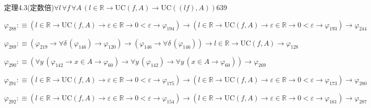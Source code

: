 \begin{fullproof}{定理4.3(定数倍)}{$\forall l\,\forall f\,\forall A\,(l \in \mathbb{R} \to \mathrm{UC}(f,A) \to \mathrm{UC}((l f),A))$}{639}
\begin{abbrevlist}
\item $\varphi_{288} :\equiv (l \in \mathbb{R} \to \mathrm{UC}(f,A) \to \varepsilon \in \mathbb{R} \to 0 < \varepsilon \to \varphi_{194}) \to (l \in \mathbb{R} \to \mathrm{UC}(f,A) \to \varepsilon \in \mathbb{R} \to 0 < \varepsilon \to \varphi_{193}) \to \varphi_{244}$
\item $\varphi_{289} :\equiv (\varphi_{219} \to \forall \delta\,(\varphi_{146}) \to \varphi_{120}) \to (\varphi_{146} \to \forall \delta\,(\varphi_{146})) \to l \in \mathbb{R} \to \mathrm{UC}(f,A) \to \varphi_{128}$
\item $\varphi_{290} :\equiv (\forall y\,(\varphi_{142} \to x \in A \to \varphi_{60}) \to \forall y\,(\varphi_{142}) \to \forall y\,(x \in A \to \varphi_{60})) \to \varphi_{269}$
\item $\varphi_{291} :\equiv (l \in \mathbb{R} \to \mathrm{UC}(f,A) \to \varepsilon \in \mathbb{R} \to 0 < \varepsilon \to \varphi_{175}) \to (l \in \mathbb{R} \to \mathrm{UC}(f,A) \to \varepsilon \in \mathbb{R} \to 0 < \varepsilon \to \varphi_{173}) \to \varphi_{280}$
\item $\varphi_{292} :\equiv (l \in \mathbb{R} \to \mathrm{UC}(f,A) \to \varepsilon \in \mathbb{R} \to 0 < \varepsilon \to \varphi_{154}) \to (l \in \mathbb{R} \to \mathrm{UC}(f,A) \to \varepsilon \in \mathbb{R} \to 0 < \varepsilon \to \varphi_{161}) \to \varphi_{287}$
\end{abbrevlist}
\end{fullproof}
